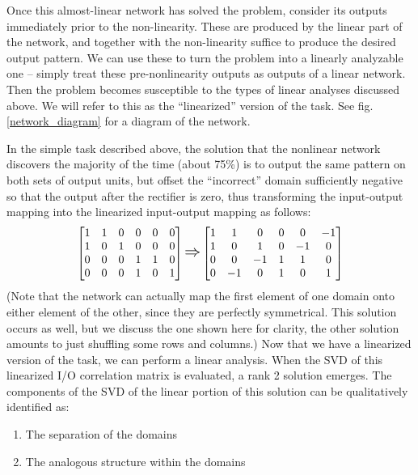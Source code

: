 \documentclass[10pt,letterpaper]{article}
\begin{document}
Once this almost-linear network has solved the problem, consider its outputs immediately prior to the non-linearity. These are produced by the linear part of the network, and together with the non-linearity suffice to produce the desired output pattern. We can use these to turn the problem into a linearly analyzable one -- simply treat these pre-nonlinearity outputs as outputs of a linear network. Then the problem becomes susceptible to the types of linear analyses discussed above. We will refer to this as the ``linearized'' version of the task. See fig. \ref{network_diagram} for a diagram of the network. \par 
In the simple task described above, the solution that the nonlinear network discovers the majority of the time (about 75\%) is to output the same pattern on both sets of output units, but offset the ``incorrect'' domain sufficiently negative so that the output after the rectifier is zero, thus transforming the input-output mapping into the linearized input-output mapping as follows:
{ 
\[
\left[ \begin{matrix} 
1 & 1 & 0 & 0 & 0 & 0 \\
1 & 0 & 1 & 0 & 0 & 0 \\
 0 & 0 & 0 & 1 & 1 & 0\\
 0 & 0 & 0 & 1 & 0 & 1\\
\end{matrix}  \right] 
\mathlarger{\mathlarger{\Rightarrow}}
\left[ \begin{matrix} 
1 & 1 & 0 & 0 & 0 & -1 \\
1 & 0 & 1 & 0 & -1 & 0 \\
 0 & 0 & -1 & 1 & 1 & 0\\
 0 & -1 & 0 & 1 & 0 & 1\\
\end{matrix}  \right] 
\] }
(Note that the network can actually map the first element of one domain onto either element of the other, since they are perfectly symmetrical. This solution occurs as well, but we discuss the one shown here for clarity, the other solution amounts to just shuffling some rows and columns.) Now that we have a linearized version of the task, we can perform a linear analysis. When the SVD of this linearized I/O correlation matrix is evaluated, a rank 2 solution emerges. The components of the SVD of the linear portion of this solution can be qualitatively identified as: \begin{enumerate}
\item The separation of the domains
\item The analogous structure within the domains
\end{enumerate}
\end{document}
